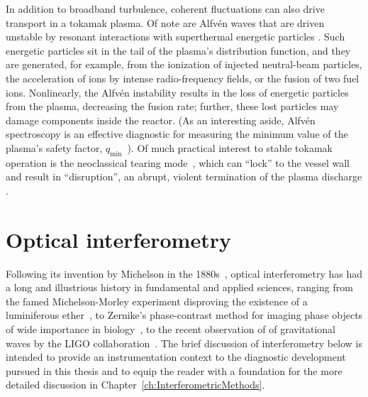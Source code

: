 In addition to broadband turbulence,
coherent fluctuations can also drive transport in a tokamak plasma.
Of note are Alfv\'{e}n waves that are driven unstable
by resonant interactions with superthermal energetic particles
\cite{wesson,heidbrink_pp08}.
Such energetic particles sit in the tail
of the plasma's distribution function, and
they are generated, for example, from
the ionization of injected neutral-beam particles,
the acceleration of ions by intense radio-frequency fields, or
the fusion of two fuel ions.
Nonlinearly, the Alfv\'{e}n instability
results in the loss of energetic particles from the plasma,
decreasing the fusion rate;
further, these lost particles may damage components inside the reactor.
(As an interesting aside, Alfv\'{e}n spectroscopy is an effective diagnostic
for measuring the minimum value of the plasma's safety factor,
$q_{\text{min}}$~\cite{wesson,edlund_prl09,breizman_pp05}).
Of much practical interest to stable tokamak operation
is the neoclassical tearing mode~\cite[Sec.~7.3]{wesson},
which can ``lock'' to the vessel wall~\cite[Sec.~7.10]{wesson}
and result in ``disruption'',
an abrupt, violent termination of the plasma discharge
\cite[Sec.~7.7-7.9]{wesson}.


\section{Optical interferometry}
Following its invention by Michelson in the 1880s~\cite{nobel_prize_michelson},
optical interferometry has had a long and illustrious history
in fundamental and applied sciences, ranging from
the famed Michelson-Morley experiment
disproving the existence of a luminiferous ether~\cite{michelson_ajs1887},
to Zernike's phase-contrast method for imaging phase objects
of wide importance in biology~\cite{nobel_prize_zernike},
to the recent observation of of gravitational waves
by the LIGO collaboration~\cite{ligo_prl16}.
The brief discussion of interferometry below is intended
to provide an instrumentation context
to the diagnostic development pursued in this thesis and
to equip the reader with a foundation
for the more detailed discussion in
Chapter~\ref{ch:InterferometricMethods}.

